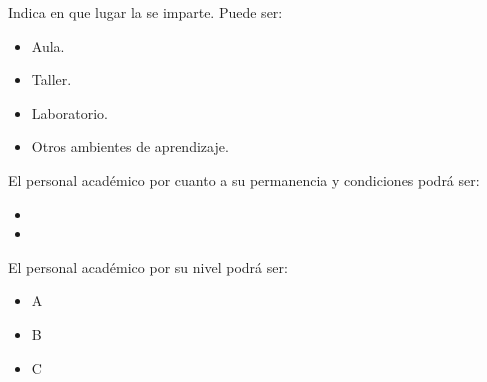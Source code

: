 \begin{bGlosario}
%	
%

	
	 Indica en que lugar la  se imparte. Puede ser:
	\begin{itemize}
		\item Aula.
		\item Taller.
		\item Laboratorio.
		\item Otros ambientes de aprendizaje.
	\end{itemize}

	 El personal académico por cuanto a su permanencia y condiciones podrá ser:
	
	\begin{itemize}
		\item {}
		\item {}
	\end{itemize}

		
	 El personal académico por su nivel podrá ser:
	\begin{itemize}
		\item A
		\item B
		\item C 
	\end{itemize}



\end{bGlosario}
